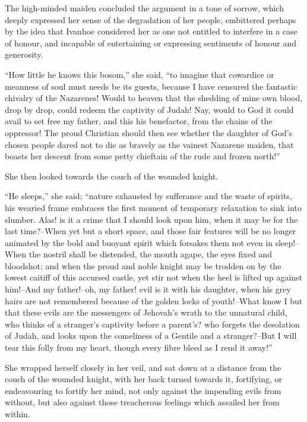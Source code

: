 The high-minded maiden concluded the argument in a tone of sorrow, which
deeply expressed her sense of the degradation of her people, embittered
perhaps by the idea that Ivanhoe considered her as one not entitled to
interfere in a case of honour, and incapable of entertaining or
expressing sentiments of honour and generosity.

``How little he knows this bosom,'' she said, ``to imagine that
cowardice or meanness of soul must needs be its guests, because I have
censured the fantastic chivalry of the Nazarenes! Would to heaven that
the shedding of mine own blood, drop by drop, could redeem the captivity
of Judah! Nay, would to God it could avail to set free my father, and
this his benefactor, from the chains of the oppressor! The proud
Christian should then see whether the daughter of God's chosen people
dared not to die as bravely as the vainest Nazarene maiden, that boasts
her descent from some petty chieftain of the rude and frozen north!''

She then looked towards the couch of the wounded knight.

``He sleeps,'' she said; ``nature exhausted by sufferance and the waste
of spirits, his wearied frame embraces the first moment of temporary
relaxation to sink into slumber. Alas! is it a crime that I should look
upon him, when it may be for the last time?--When yet but a short space,
and those fair features will be no longer animated by the bold and
buoyant spirit which forsakes them not even in sleep!--When the nostril
shall be distended, the mouth agape, the eyes fixed and bloodshot; and
when the proud and noble knight may be trodden on by the lowest caitiff
of this accursed castle, yet stir not when the heel is lifted up against
him!--And my father!--oh, my father! evil is it with his daughter, when
his grey hairs are not remembered because of the golden locks of
youth!--What know I but that these evils are the messengers of Jehovah's
wrath to the unnatural child, who thinks of a stranger's captivity
before a parent's? who forgets the desolation of Judah, and looks upon
the comeliness of a Gentile and a stranger?--But I will tear this folly
from my heart, though every fibre bleed as I rend it away!''

She wrapped herself closely in her veil, and sat down at a distance from
the couch of the wounded knight, with her back turned towards it,
fortifying, or endeavouring to fortify her mind, not only against the
impending evils from without, but also against those treacherous
feelings which assailed her from within.
